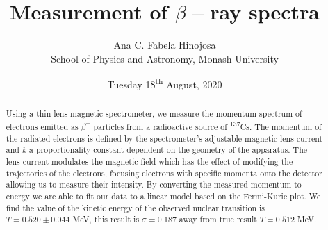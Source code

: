 \documentclass[12pt,a4paper]{article}
\title{Measurement of $\beta-$ray spectra}
\author{Ana C. Fabela Hinojosa\\
\small{School of Physics and Astronomy, Monash University}}
\date{Tuesday 18\textsuperscript{th} August, 2020}
\begin{document}
\maketitle
\begin{abstract}
Using a thin lens magnetic spectrometer, we measure the momentum spectrum of electrons emitted as $\beta^{-}$ particles from a radioactive source of  \textsuperscript{137}Cs. 
The momentum of the radiated electrons is defined by the spectrometer's adjustable magnetic lens current and $k$ a proportionality constant dependent on the geometry of the apparatus. The lens current modulates the magnetic field which has the effect of modifying the trajectories of the electrons, focusing electrons with specific momenta onto the detector allowing us to measure their intensity. By converting the measured momentum to energy we are able to fit our data to a linear model based on the Fermi-Kurie plot. We find the value of the kinetic energy of the observed nuclear transition is $T = 0.520 \pm 0.044$ MeV, this result is $\sigma = 0.187$ away from true result $T = 0.512$ MeV.
\end{abstract}
\end{document}
